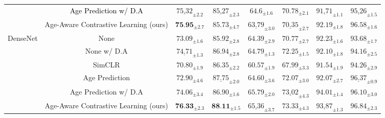 \documentclass[runningheads]{llncs}
\newcommand{\rebuttal}[1]{\textcolor{black}{#1}}
\begin{document}
\begin{table}[h!]
{\begin{tabular}{c|c|c c|c c|c c}
                          & \rebuttal{Age Prediction w/ D.A} & $\underline{75.32}_{\pm2.2}$ & $\underline{85.27}_{\pm2.3}$ & $\mathbf{64.6_{\pm1.6}}$ & $\mathbf{70.78_{\pm2.1}}$ &$\underline{91.71}_{\pm1.1}$ & $\underline{95.26}_{\pm1.5}$\\
                          & Age-Aware Contrastive Learning (ours) & $\textbf{75.95}_{\pm 2.7}$ & $\mathbf{85.73}_{\pm 4.7}$ & $\underline{63.79}_{\pm3.0}$ & $\underline{70.35}_{\pm2.7}$ & $\mathbf{92.19_{\pm1.8}}$ & $\mathbf{96.58_{\pm1.6}}$\\
    \hline
    \multirow{6}{*}{DenseNet} & None & $73.09_{\pm1.6}$ & $85.92_{\pm2.8}$ & $64.39_{\pm2.9}$ & $70.77_{\pm2.7}$& $92.23_{\pm1.6}$& $93.68_{\pm1.7}$ \\
                               & None w/ D.A & $\underline{74.71}_{\pm1.3}$ & $86.94_{\pm2.8}$ & $64.79_{\pm1.3}$ & $72.25_{\pm1.5}$& $92.10_{\pm 1.8}$ & $94.16_{\pm2.5}$ \\
                               & SimCLR \cite{chen2020simCLR} & $70.80_{\pm1.9}$ & $86.35_{\pm2.2}$ & $60.57_{\pm1.9}$ & $67.99_{\pm3.3}$ & $91.54_{\pm1.9}$ & $94.26_{\pm2.9}$ \\
                               & Age Prediction  & $72.90_{\pm4.6}$ & $\underline{87.75}_{\pm2.0}$ & $64.60_{\pm 3.6}$ & $72.07_{\pm 3.0}$ & $92.07_{\pm2.7}$& $\underline{96.37}_{\pm0.9}$ \\
                               & Age Prediction w/ D.A & $74.06_{\pm3.4}$ & $86.90_{\pm1.6}$ & $\mathbf{65.79}_{\pm 2.0}$ & $\underline{73.02}_{\pm 4.3}$ & $\mathbf{94.01_{\pm{1.4}}}$ & $96.10_{\pm3.0}$ \\
                               & Age-Aware Contrastive Learning (ours) & $\textbf{76.33}_{\pm2.3}$ & $\textbf{88.11}_{\pm1.5}$ & $\underline{65.36}_{\pm3.7}$ & $\mathbf{73.33_{\pm4.3}}$ & $\underline{93.87}_{\pm1.3}$ & $\mathbf{96.84_{\pm2.3}}$ \\

\end{tabular}}
\end{table}
\end{document}
